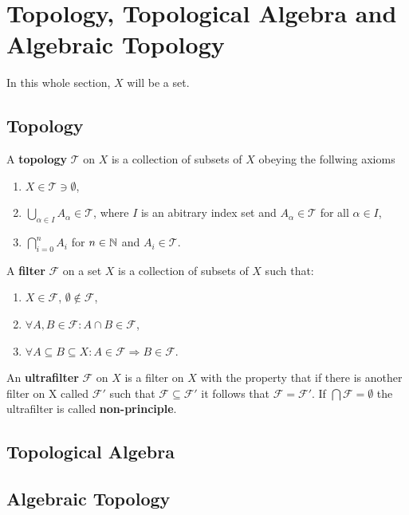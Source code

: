 \section{Topology, Topological Algebra and Algebraic Topology}
In this whole section, $X$ will be a set.

\subsection{Topology}

\begin{defin}
  A \textbf{topology} $\mathcal{T}$ on $X$ is a collection of subsets of $X$ obeying the follwing axioms
  \begin{enumerate}
    \item $X \in \mathcal{T} \ni \emptyset$,
    \item $\bigcup\limits_{\alpha \in I}A_{\alpha} \in \mathcal{T}$, where $I$ is an abitrary index set and $A_{\alpha} \in \mathcal{T}$ for all $\alpha \in I$,
    \item $\bigcap\limits_{i=0}^n A_i$ for $n \in \mathbb{N}$ and $A_i \in \mathcal{T}$.
  \end{enumerate}
\end{defin}

\begin{defin}
  A \textbf{filter} $\mathcal{F}$ on a set $X$ is a collection of subsets of $X$ such that:
  \begin{enumerate}
    \item $X \in \mathcal{F}$, $\emptyset \notin \mathcal{F}$,
    \item $\forall A, B \in \mathcal{F}\colon A\cap B \in \mathcal{F}$,
    \item $\forall A \subseteq B \subseteq X: A \in \mathcal{F} \Rightarrow B \in \mathcal{F}$.
  \end{enumerate}
\end{defin}

\begin{defin} 
  An \textbf{ultrafilter} $\mathcal{F}$ on $X$ is a filter on $X$ with the property that if there is another filter on X called $\mathcal{F}'$ such that $\mathcal{F} \subseteq \mathcal{F}'$ it follows that $\mathcal{F} = \mathcal{F}'$.
  If $\bigcap \mathcal{F} = \emptyset$ the ultrafilter is called \textbf{non-principle}.
\end{defin}

\subsection{Topological Algebra}

\subsection{Algebraic Topology}
